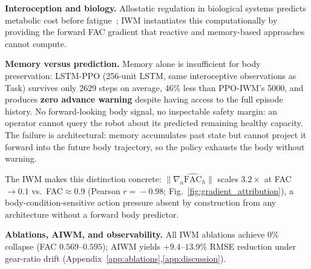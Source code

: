 \documentclass{article}
\begin{document}
{\textbf{Interoception and biology.}
Allostatic regulation in biological systems predicts metabolic cost before fatigue~\citep{seth2013interoceptive}; IWM instantiates this computationally by providing the forward FAC gradient that reactive and memory-based approaches cannot compute.

\textbf{Memory versus prediction.}
Memory alone is insufficient for body preservation: LSTM-PPO (256-unit LSTM, same interoceptive observations as Task) survives only 2629 steps on average, 46\% less than PPO-IWM's 5000, and produces \textbf{zero advance warning} despite having access to the full episode history. No forward-looking body signal, no inspectable safety margin: an operator cannot query the robot about its predicted remaining healthy capacity. The failure is architectural: memory accumulates past state but cannot project it forward into the future body trajectory, so the policy exhausts the body without warning.

The IWM makes this distinction concrete: $\|\nabla_a\hat{\mathrm{FAC}}_h\|$ scales $3.2\times$ at FAC$\!\to\!0.1$ vs.\ FAC$\!\approx\!0.9$ (Pearson $r\!=\!-0.98$; Fig.~\ref{fig:gradient_attribution}), a body-condition-sensitive action pressure absent by construction from any architecture without a forward body predictor.

\textbf{Ablations, AIWM, and observability.}
All IWM ablations achieve 0\% collapse (FAC $0.569$--$0.595$); AIWM yields $+9.4$--$13.9\%$ RMSE reduction under gear-ratio drift (Appendix~\ref{app:ablations},\ref{app:discussion}).

}
\end{document}
